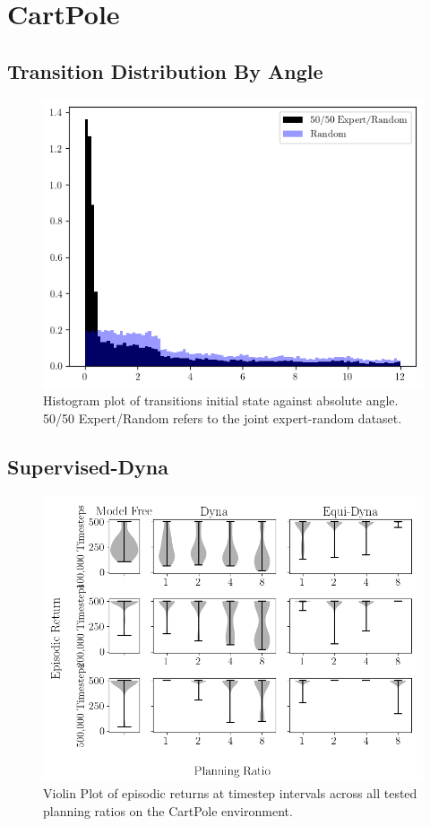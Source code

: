 \section{CartPole}
\subsection{Transition Distribution By Angle}
\begin{figure}[h!]
	\centering
	\includegraphics[width=\textwidth]{Figures/angles_cp.png}
	\caption{Histogram plot of transitions initial state against absolute angle. 50/50 Expert/Random refers to the joint expert-random dataset. }
	\label{ap:dist_cp}
\end{figure}

\subsection{Supervised-Dyna}

\begin{figure}[h!]
	\centering
	\includegraphics[width=\textwidth]{Figures/violin_cp_expert.png}
	\caption{Violin Plot of episodic returns at timestep intervals across all tested planning ratios on the CartPole environment.}
\end{figure}

